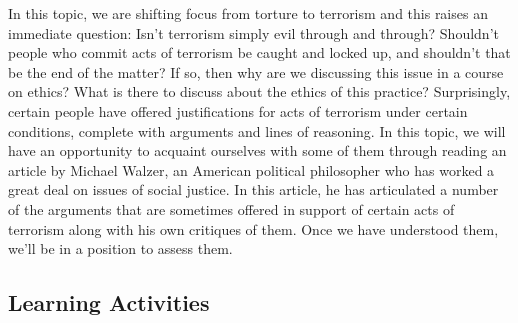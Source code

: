 \documentclass[
]{book}
\begin{document}
In this topic, we are shifting focus from torture to terrorism and this raises an immediate question: Isn't terrorism simply evil through and through? Shouldn't people who commit acts of terrorism be caught and locked up, and shouldn't that be the end of the matter? If so, then why are we discussing this issue in a course on ethics? What is there to discuss about the ethics of this practice?
Surprisingly, certain people have offered justifications for acts of terrorism under certain conditions, complete with arguments and lines of reasoning. In this topic, we will have an opportunity to acquaint ourselves with some of them through reading an article by Michael Walzer, an American political philosopher who has worked a great deal on issues of social justice. In this article, he has articulated a number of the arguments that are sometimes offered in support of certain acts of terrorism along with his own critiques of them. Once we have understood them, we'll be in a position to assess them.

\hypertarget{learning-activities-22}{%
\subsection*{Learning Activities}\label{learning-activities-22}}
\end{document}
